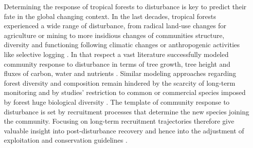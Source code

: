 \documentclass[
  11pt,
  french,
  A4paper,
  extrafontsizes,onecolumn,openright
  ]{memoir}
\begin{document}
Determining the response of tropical forests to disturbance is key to
predict their fate in the global changing context. In the last decades,
tropical forests experienced a wide range of disturbance, from radical
land-use changes for agriculture or mining
\autocites{Dezecache2017a}{Dezecache2017b} to more insidious changes of
communities structure, diversity and functioning following climatic
changes \autocite{Aubry-Kientz2015} or anthropogenic activities like
selective logging \autocite{Baraloto2012}. In that respect a vast
literature successfully modeled community response to disturbance in
terms of tree growth, tree height and fluxes of carbon, water and
nutrients \autocites{Gourlet-Fleury2000}{Piponiot2016}{Rutishauser2016}.
Similar modeling approaches regarding forest diversity and composition
remain hindered by the scarcity of long-term monitoring and by studies'
restriction to common or commercial species imposed by forest huge
biological diversity \autocite{Sebbenn2008}. The template of community
response to disturbance is set by recruitment processes that determine
the new species joining the community. Focusing on long-term recruitment
trajectories therefore give valuable insight into post-disturbance
recovery and hence into the adjustment of exploitation and conservation
guidelines \autocite{Schwartz2017}.
\end{document}
